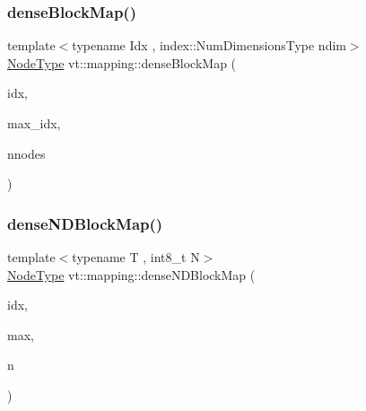 \subsubsection{\texorpdfstring{dense\+Block\+Map()}{denseBlockMap()}}
{\footnotesize\ttfamily template$<$typename Idx , index\+::\+Num\+Dimensions\+Type ndim$>$ \\
\hyperlink{namespacevt_a866da9d0efc19c0a1ce79e9e492f47e2}{Node\+Type} vt\+::mapping\+::dense\+Block\+Map (\begin{DoxyParamCaption}\item[{\hyperlink{namespacevt_1_1mapping_a1bcab0d331bff853fe09c964d5e9cc8c}{Idx\+Ptr}$<$ Idx $>$}]{idx,  }\item[{\hyperlink{namespacevt_1_1mapping_a1bcab0d331bff853fe09c964d5e9cc8c}{Idx\+Ptr}$<$ Idx $>$}]{max\+\_\+idx,  }\item[{\hyperlink{namespacevt_a866da9d0efc19c0a1ce79e9e492f47e2}{Node\+Type}}]{nnodes }\end{DoxyParamCaption})}

\mbox{\label{namespacevt_1_1mapping_a8e5581179e571387304de4b1d19640e7}} 
\subsubsection{\texorpdfstring{dense\+N\+D\+Block\+Map()}{denseNDBlockMap()}}
{\footnotesize\ttfamily template$<$typename T , int8\+\_\+t N$>$ \\
\hyperlink{namespacevt_a866da9d0efc19c0a1ce79e9e492f47e2}{Node\+Type} vt\+::mapping\+::dense\+N\+D\+Block\+Map (\begin{DoxyParamCaption}\item[{\hyperlink{namespacevt_1_1mapping_ab77f5302cd346d499e48a8c796043746}{Idx\+N\+D\+Ptr}$<$ T, N $>$}]{idx,  }\item[{\hyperlink{namespacevt_1_1mapping_ab77f5302cd346d499e48a8c796043746}{Idx\+N\+D\+Ptr}$<$ T, N $>$}]{max,  }\item[{\hyperlink{namespacevt_a866da9d0efc19c0a1ce79e9e492f47e2}{Node\+Type}}]{n }\end{DoxyParamCaption})}

\mbox{\label{namespacevt_1_1mapping_a270a829564506d7b8de50c9867ff2b76}} 
